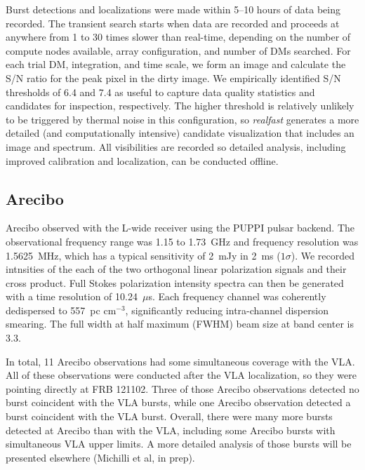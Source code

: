 \documentclass[twocolumn]{aastex61}
\newcommand{\frb}{FRB 121102}
\begin{document}
Burst detections and localizations were made within 5--10 hours of data being recorded. The transient search starts when data are recorded and proceeds at anywhere from 1 to 30 times slower than real-time, depending on the number of compute nodes available, array configuration, and number of DMs searched. For each trial DM, integration, and time scale, we form an image and calculate the S/N ratio for the peak pixel in the dirty image. We empirically identified S/N thresholds of 6.4 and 7.4 as useful to capture data quality statistics and candidates for inspection, respectively. The higher threshold is relatively unlikely to be triggered by thermal noise in this configuration, so \textit{realfast} generates a more detailed (and computationally intensive) candidate visualization that includes an image and spectrum. All visibilities are recorded so detailed analysis, including improved calibration and localization, can be conducted offline. 

\subsection{Arecibo}

Arecibo observed with the L-wide receiver using the PUPPI pulsar backend. The observational frequency range was 1.15 to 1.73~GHz and frequency resolution was 1.5625~MHz, which has a typical sensitivity of 2~mJy in 2~ms ($1\sigma$). We recorded intnsities of the each of the two orthogonal linear polarization signals and their cross product. Full Stokes polarization intensity spectra can then be generated with a time resolution of 10.24~$\mu$s. Each frequency channel was coherently dedispersed to 557~pc cm$^{-3}$, significantly reducing intra-channel dispersion smearing. The full width at half maximum (FWHM) beam size at band center is 3.3\arcmin.

In total, 11 Arecibo observations had some simultaneous coverage with the VLA. All of these observations were conducted after the VLA localization, so they were pointing directly at \frb. Three of those Arecibo observations detected no burst coincident with the VLA bursts, while one Arecibo observation detected a burst coincident with the VLA burst. 
Overall, there were many more bursts detected at Arecibo than with the VLA, including some Arecibo bursts with simultaneous VLA upper limits. A more detailed analysis of those bursts will be presented elsewhere (Michilli et al, in prep).
\end{document}
